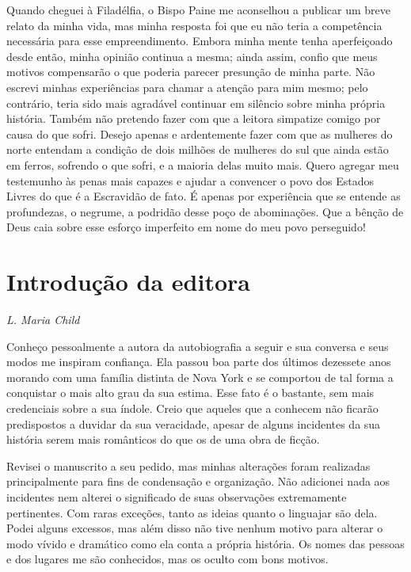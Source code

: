 Quando cheguei à Filadélfia, o Bispo
Paine me aconselhou a publicar um breve relato da minha vida, mas minha
resposta foi que eu não teria a competência necessária para esse
empreendimento. Embora minha mente tenha aperfeiçoado desde então, minha
opinião continua a mesma; ainda assim, confio que meus motivos
compensarão o que poderia parecer presunção de minha parte. Não escrevi
minhas experiências para chamar a atenção para mim mesmo; pelo
contrário, teria sido mais agradável continuar em silêncio sobre minha
própria história. Também não pretendo fazer com que a leitora simpatize
comigo por causa do que sofri. Desejo apenas e ardentemente fazer com
que as mulheres do norte entendam a condição de dois milhões de mulheres
do sul que ainda estão em ferros, sofrendo o que sofri, e a maioria
delas muito mais. Quero agregar meu testemunho às penas mais capazes e
ajudar a convencer o povo dos Estados Livres do que é a Escravidão de
fato. É apenas por experiência que se entende as profundezas, o negrume,
a podridão desse poço de abominações. Que a bênção de Deus caia sobre
esse esforço imperfeito em nome do meu povo perseguido!

\chapter{Introdução da editora}

\begin{flushright}
\emph{L. Maria Child}
\end{flushright}

Conheço pessoalmente a autora da
autobiografia a seguir e sua conversa e seus modos me inspiram
confiança. Ela passou boa parte
dos últimos dezessete anos morando com uma família distinta de Nova York
e se comportou de tal forma a conquistar o mais alto grau da sua estima.
Esse fato é o bastante, sem mais credenciais sobre a sua índole. Creio
que aqueles que a conhecem não ficarão predispostos a duvidar da sua
veracidade, apesar de alguns incidentes da sua história serem mais
românticos do que os de uma obra de ficção.

Revisei o manuscrito a seu pedido, mas
minhas alterações foram realizadas principalmente para fins de
condensação e organização. Não adicionei nada aos incidentes nem alterei
o significado de suas observações extremamente pertinentes. Com raras
exceções, tanto as ideias quanto o linguajar são dela. Podei alguns
excessos, mas além disso não tive nenhum motivo para alterar o modo
vívido e dramático como ela conta a própria história. Os nomes das
pessoas e dos lugares me são conhecidos, mas os oculto com bons motivos.

